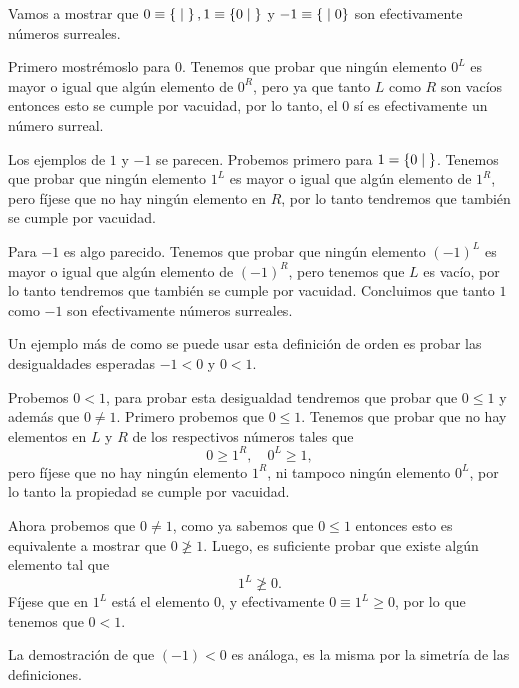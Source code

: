     \begin{example}
        Vamos a mostrar que $0\equiv \left\{\;\middle|\; \right\}, 1\equiv\left\{0\;\middle|\; \right\}$ y $-1\equiv\left\{\;\middle|\; 0\right\}$ son efectivamente n\'umeros surreales.

        Primero mostr\'emoslo para $0$. Tenemos que probar que ning\'un elemento $0^L$ es mayor o igual que algún elemento de $0^R$, pero ya que tanto $L$ como $R$ son vac\'ios entonces esto se cumple por vacuidad, por lo tanto, el $0$ s\'i es efectivamente un n\'umero surreal.

        Los ejemplos de $1$ y $-1$ se parecen. Probemos primero para $1=\left\{0\;\middle|\; \right\}$. Tenemos que probar que ning\'un elemento $1^L$ es mayor o igual que algún elemento de $1^R$, pero f\'ijese que no hay ning\'un elemento en $R
        $, por lo tanto tendremos que tambi\'en se cumple por vacuidad.

        Para $-1$ es algo parecido. Tenemos que probar que ning\'un elemento $(-1)^L$ es mayor o igual que alg\'un elemento de $(-1)^R$, pero tenemos que $L$ es vac\'io, por lo tanto tendremos que tambi\'en se cumple por vacuidad. Concluimos que tanto $1$ como $-1$ son efectivamente n\'umeros surreales.
    \end{example}

    \begin{example}\label{ExFirstOrder}
        Un ejemplo m\'as de como se puede usar esta definici\'on de orden es probar las desigualdades esperadas $-1< 0$ y $0<1$.

        Probemos $0 < 1$, para probar esta desigualdad tendremos que probar que $0\le 1$ y adem\'as que $0 \not= 1$. Primero probemos que $0\le 1$. Tenemos que probar que no hay elementos en $L$ y $R$ de los respectivos n\'umeros tales que
        \[
            0 \ge 1^R, \quad 0^L \ge 1,
        \]
        pero f\'ijese que no hay ningún elemento $1^R$, ni tampoco ningún elemento $0^L$, por lo tanto la propiedad se cumple por vacuidad.

        Ahora probemos que $0 \not= 1$, como ya sabemos que $0\le 1$ entonces esto es equivalente a mostrar que $0\not\ge 1$. Luego, es suficiente probar que existe alg\'un elemento tal que
        \[
            1^L \not\ge 0.
        \]
        F\'ijese que en $1^L$ est\'a el elemento $0$, y efectivamente $0 \equiv 1^L \ge 0$, por lo que tenemos que $0 < 1$.

        La demostraci\'on de que $(-1) < 0$ es an\'aloga, es la misma por la simetr\'ia de las definiciones.
    \end{example}

